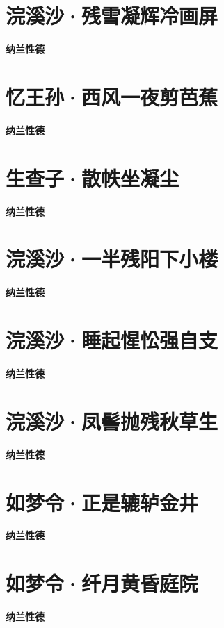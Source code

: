 \documentclass[12pt,a4paper]{ctexbook}
\begin{document}
\section{浣溪沙·残雪凝辉冷画屏}
\textbf{纳兰性德}\par\vspace{0.5em}

\section{忆王孙·西风一夜剪芭蕉}
\textbf{纳兰性德}\par\vspace{0.5em}

\section{生查子·散帙坐凝尘}
\textbf{纳兰性德}\par\vspace{0.5em}

\section{浣溪沙·一半残阳下小楼}
\textbf{纳兰性德}\par\vspace{0.5em}

\section{浣溪沙·睡起惺忪强自支}
\textbf{纳兰性德}\par\vspace{0.5em}

\section{浣溪沙·凤髻抛残秋草生}
\textbf{纳兰性德}\par\vspace{0.5em}

\section{如梦令·正是辘轳金井}
\textbf{纳兰性德}\par\vspace{0.5em}

\section{如梦令·纤月黄昏庭院}
\textbf{纳兰性德}\par\vspace{0.5em}
\end{document}

